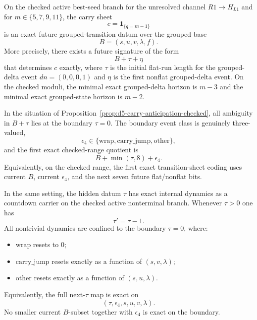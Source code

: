 
\begin{proposition}\label{prop:d5-carry-anticipation-checked}
On the checked active best-seed branch for the unresolved channel $R1\to H_{L1}$ and for
$m\in\{5,7,9,11\}$, the carry sheet
\[
c=\mathbf 1_{\{q=m-1\}}
\]
is an exact future grouped-transition datum over the grouped base
\[
B=(s,u,v,\lambda,f).
\]
More precisely, there exists a future signature of the form
\[
B+\tau+\eta
\]
that determines $c$ exactly, where $\tau$ is the initial flat-run length for the grouped-delta event
$dn=(0,0,0,1)$ and $\eta$ is the first nonflat grouped-delta event. On the checked moduli, the minimal exact grouped-delta horizon is $m-3$ and the minimal exact grouped-state horizon is $m-2$.
\end{proposition}

\begin{proposition}\label{prop:d5-boundary-sharpening-checked}
In the situation of Proposition~\ref{prop:d5-carry-anticipation-checked}, all ambiguity in $B+\tau$ lies at the boundary $\tau=0$. The boundary event class is genuinely three-valued,
\[
\epsilon_4\in\{\mathrm{wrap},\mathrm{carry\_jump},\mathrm{other}\},
\]
and the first exact checked-range quotient is
\[
B+\min(\tau,8)+\epsilon_4.
\]
Equivalently, on the checked range, the first exact transition-sheet coding uses current $B$, current $\epsilon_4$, and the next seven future flat/nonflat bits.
\end{proposition}

\begin{proposition}\label{prop:d5-tau-countdown-checked}
In the same setting, the hidden datum $\tau$ has exact internal dynamics as a countdown carrier on the checked active nonterminal branch.
Whenever $\tau>0$ one has
\[
\tau'=\tau-1.
\]
All nontrivial dynamics are confined to the boundary $\tau=0$, where:
\begin{itemize}
    \item $\mathrm{wrap}$ resets to $0$;
    \item $\mathrm{carry\_jump}$ resets exactly as a function of $(s,v,\lambda)$;
    \item $\mathrm{other}$ resets exactly as a function of $(s,u,\lambda)$.
\end{itemize}
Equivalently, the full next-$\tau$ map is exact on
\[
(\tau,\epsilon_4,s,u,v,\lambda).
\]
No smaller current $B$-subset together with $\epsilon_4$ is exact on the boundary.
\end{proposition}

